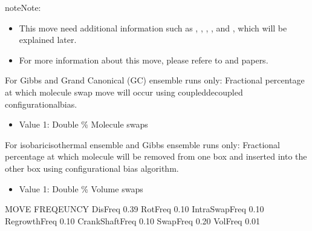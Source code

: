 \documentclass[letterpaper,10pt,english]{sphinxmanual}
\begin{document}
\begin{description}
\begin{sphinxadmonition}{note}{Note:}
\begin{itemize}
\item {} 
This move need additional information such as , , , , and , which will be explained later.

\item {} 
For more information about this move, please refere to  and  papers.

\end{itemize}
\end{sphinxadmonition}

\item[{\sphinxcode{\sphinxupquote{SwapFreq}}}] \leavevmode
For Gibbs and Grand Canonical (GC) ensemble runs only: Fractional percentage at which molecule swap move will occur using coupled\sphinxhyphen{}decoupled configurational\sphinxhyphen{}bias.
\begin{itemize}
\item {} 
Value 1: Double \sphinxhyphen{} \% Molecule swaps

\end{itemize}

\item[{\sphinxcode{\sphinxupquote{VolFreq}}}] \leavevmode
For isobaric\sphinxhyphen{}isothermal ensemble and Gibbs ensemble runs only: Fractional percentage at which molecule will be removed from one box and inserted into the other box using configurational bias algorithm.
\begin{itemize}
\item {} 
Value 1: Double \sphinxhyphen{} \% Volume swaps

\end{itemize}

\end{description}

\begin{sphinxVerbatim}[commandchars=\\\{\}]
\PYGZsh{}\PYGZsh{}\PYGZsh{}\PYGZsh{}\PYGZsh{}\PYGZsh{}\PYGZsh{}\PYGZsh{}\PYGZsh{}\PYGZsh{}\PYGZsh{}\PYGZsh{}\PYGZsh{}\PYGZsh{}\PYGZsh{}\PYGZsh{}\PYGZsh{}\PYGZsh{}\PYGZsh{}\PYGZsh{}\PYGZsh{}\PYGZsh{}\PYGZsh{}\PYGZsh{}\PYGZsh{}\PYGZsh{}\PYGZsh{}\PYGZsh{}\PYGZsh{}\PYGZsh{}\PYGZsh{}\PYGZsh{}\PYGZsh{}
\PYGZsh{} MOVE FREQEUNCY
\PYGZsh{}\PYGZsh{}\PYGZsh{}\PYGZsh{}\PYGZsh{}\PYGZsh{}\PYGZsh{}\PYGZsh{}\PYGZsh{}\PYGZsh{}\PYGZsh{}\PYGZsh{}\PYGZsh{}\PYGZsh{}\PYGZsh{}\PYGZsh{}\PYGZsh{}\PYGZsh{}\PYGZsh{}\PYGZsh{}\PYGZsh{}\PYGZsh{}\PYGZsh{}\PYGZsh{}\PYGZsh{}\PYGZsh{}\PYGZsh{}\PYGZsh{}\PYGZsh{}\PYGZsh{}\PYGZsh{}\PYGZsh{}\PYGZsh{}
DisFreq         0.39
RotFreq         0.10
IntraSwapFreq   0.10
RegrowthFreq    0.10
CrankShaftFreq  0.10
SwapFreq        0.20
VolFreq         0.01
\end{sphinxVerbatim}
\end{document}
